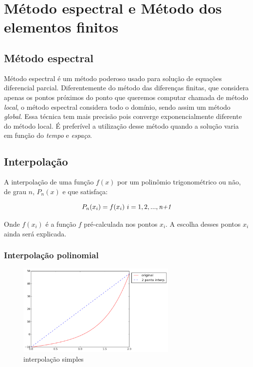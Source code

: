 \chapter{Método espectral e Método dos elementos finitos}
\label{cap:I}
\section{Método espectral} 

 Método espectral é um método poderoso usado para solução de equações diferencial parcial. Diferentemente do método das diferenças finitas, que considera apenas os pontos próximos do ponto que queremos computar chamada de método \emph{local}, o método espectral considera todo o domínio, sendo assim um método \emph{global}. Essa técnica tem mais precisão pois converge exponencialmente diferente do método local. É preferível a utilização desse método quando a solução varia em função do \textit{tempo} e \textit{espaço}. 

\section{Interpolação}
 A interpolação de uma função $f(x)$ por um polinômio trigonométrico ou não, de grau $n$, $P_{n}(x)$ e que satisfaça:

\begin{equation}
	P_n (x_i) = f(x_i) \ i = 1,2,...,\emph{n+1}
\end{equation}

 Onde $f(x_i)$ é a função $f$ pré-calculada nos pontos $x_i$. A escolha desses pontos $x_i$ ainda será explicada.

\subsection{Interpolação polinomial}
 \begin{figure}[!ht]
  \includegraphics[width=0.7\textwidth,center]{figuras/interpolacao_linear.png}
  \caption{interpolação simples}
\end{figure}

